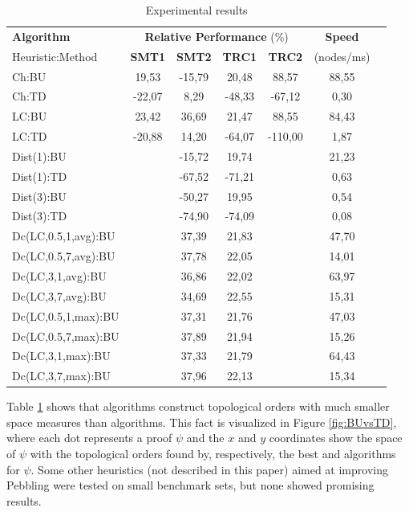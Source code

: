 \documentclass{llncs}
\begin{document}
\begin{table}
\centering
\setlength{\tabcolsep}{8pt}
\begin{tabular}{|l|c|c|c|c|c|c}
\hline
\textbf{Algorithm} & \multicolumn{4}{c|}{\textbf{Relative Performance} (\%)} & \textbf{Speed}\\ 
Heuristic:Method & \textbf{SMT1} & \textbf{SMT2} & \textbf{TRC1} & \textbf{TRC2} & (nodes/ms)\\ 
\hline\hline
Ch:BU & 19,53 & -15,79 & 20,48 & 88,57 & 88,55 \\ \hline
Ch:TD & -22,07 & 8,29 & -48,33 & -67,12 & 0,30 \\ \hline
LC:BU & 23,42 & 36,69 & 21,47 & 88,55 & 84,43 \\ \hline
LC:TD & -20,88 & 14,20 & -64,07 & -110,00 & 1,87 \\ \hline
Dist(1):BU & & -15,72 & 19,74 & & 21,23 \\ \hline
Dist(1):TD & & -67,52 & -71,21 & & 0,63 \\ \hline
Dist(3):BU & & -50,27 & 19,95 & & 0,54\\ \hline
Dist(3):TD & & -74,90 & -74,09 & & 0,08\\ \hline
Dc(LC,0.5,1,avg):BU & & 37,39 & 21,83 &  & 47,70\\ \hline
Dc(LC,0.5,7,avg):BU & & 37,78 & 22,05 &  & 14,01 \\ \hline
Dc(LC,3,1,avg):BU & & 36,86 & 22,02 &  & 63,97\\ \hline
Dc(LC,3,7,avg):BU & & 34,69 & 22,55 &  & 15,31 \\ \hline
Dc(LC,0.5,1,max):BU & & 37,31 & 21,76 &  & 47,03 \\ \hline
Dc(LC,0.5,7,max):BU & & 37,89 & 21,94 &  & 15,26 \\ \hline
Dc(LC,3,1,max):BU & & 37,33 & 21,79 &  & 64,43 \\ \hline
Dc(LC,3,7,max):BU & & 37,96 & 22,13 & & 15,34 \\
\bottomrule
\end{tabular}
\caption{Experimental results}
\label{tab:results}
\end{table}


\noindent
Table \ref{tab:results} shows that  algorithms construct topological orders with much smaller space measures than  algorithms. This fact is visualized in Figure \ref{fig:BUvsTD}, where each dot represents a proof $\psi$ and the $x$ and $y$ coordinates show the space of $\psi$ with the topological orders found by, respectively, the best  and  algorithms for $\psi$. Some other heuristics (not described in this paper) aimed at improving  Pebbling were tested on small benchmark sets, but none showed promising results.
\end{document}
